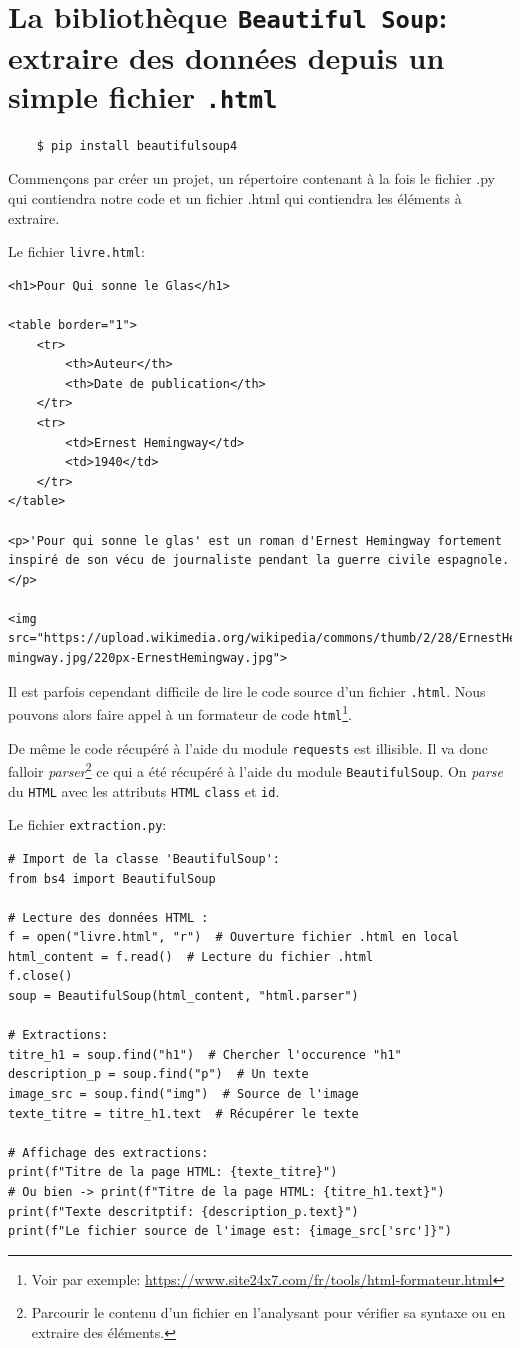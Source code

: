 \documentclass[a4paper,12pt]{book}
\begin{document}
\section{La bibliothèque \texttt{Beautiful Soup}: extraire des données depuis un simple fichier \texttt{.html}}
\begin{verbatim}
    $ pip install beautifulsoup4
\end{verbatim}
\medskip

Commençons par créer un projet, un répertoire contenant à la fois le fichier .py qui contiendra notre code et un fichier .html qui contiendra les éléments à extraire.
\medskip

Le fichier \texttt{livre.html}:
\begin{verbatim}
<h1>Pour Qui sonne le Glas</h1>

<table border="1">
    <tr>
        <th>Auteur</th>
        <th>Date de publication</th>
    </tr>
    <tr>
        <td>Ernest Hemingway</td>
        <td>1940</td>
    </tr>
</table>

<p>'Pour qui sonne le glas' est un roman d'Ernest Hemingway fortement 
inspiré de son vécu de journaliste pendant la guerre civile espagnole. </p>

<img src="https://upload.wikimedia.org/wikipedia/commons/thumb/2/28/ErnestHe
mingway.jpg/220px-ErnestHemingway.jpg">
\end{verbatim}
\medskip

Il est parfois cependant difficile de lire le code source d'un fichier \texttt{.html}. Nous pouvons alors faire appel à un formateur de code \texttt{html}\footnote{Voir par exemple: \url{https://www.site24x7.com/fr/tools/html-formateur.html}}.
\medskip

De même le code récupéré à l'aide du module \texttt{requests} est illisible. Il va donc falloir \textit{parser}\footnote{Parcourir le contenu d'un fichier en l'analysant pour vérifier sa syntaxe ou en extraire des éléments.} ce qui a été récupéré à l'aide du module \texttt{BeautifulSoup}. On \textit{parse} du \texttt{HTML} avec les attributs \texttt{HTML} \texttt{class} et \texttt{id}.
\medskip

Le fichier \texttt{extraction.py}:
\begin{lstlisting}[caption=Exemple simple d'extraction avec \texttt{Beautiful Soup}]
# Import de la classe 'BeautifulSoup':
from bs4 import BeautifulSoup  

# Lecture des données HTML :
f = open("livre.html", "r")  # Ouverture fichier .html en local
html_content = f.read()  # Lecture du fichier .html
f.close()
soup = BeautifulSoup(html_content, "html.parser")

# Extractions:
titre_h1 = soup.find("h1")  # Chercher l'occurence "h1"
description_p = soup.find("p")  # Un texte
image_src = soup.find("img")  # Source de l'image
texte_titre = titre_h1.text  # Récupérer le texte

# Affichage des extractions:
print(f"Titre de la page HTML: {texte_titre}")
# Ou bien -> print(f"Titre de la page HTML: {titre_h1.text}")
print(f"Texte descritptif: {description_p.text}")
print(f"Le fichier source de l'image est: {image_src['src']}")
\end{lstlisting}
\medskip
\end{document}
